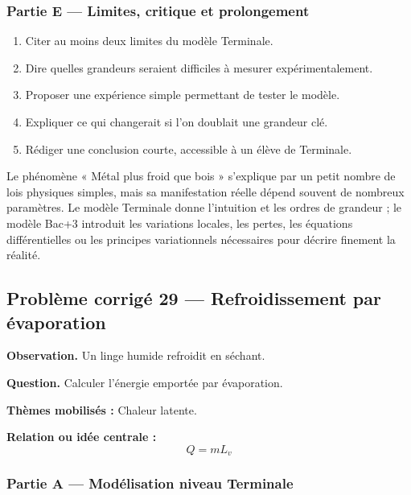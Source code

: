 \documentclass[11pt,a4paper]{article}
\begin{document}
\subsubsection*{Partie E — Limites, critique et prolongement}

\begin{enumerate}
  \item Citer au moins deux limites du modèle Terminale.
  \item Dire quelles grandeurs seraient difficiles à mesurer expérimentalement.
  \item Proposer une expérience simple permettant de tester le modèle.
  \item Expliquer ce qui changerait si l'on doublait une grandeur clé.
  \item Rédiger une conclusion courte, accessible à un élève de Terminale.
\end{enumerate}

\begin{corrigebox}
Le phénomène « Métal plus froid que bois » s'explique par un petit nombre de lois physiques simples, mais sa manifestation réelle dépend souvent de nombreux paramètres. Le modèle Terminale donne l'intuition et les ordres de grandeur ; le modèle Bac+3 introduit les variations locales, les pertes, les équations différentielles ou les principes variationnels nécessaires pour décrire finement la réalité.
\end{corrigebox}

\subsection{Problème corrigé 29 — Refroidissement par évaporation}

\begin{exercicebox}
\textbf{Observation.} Un linge humide refroidit en séchant.

\medskip
\textbf{Question.} Calculer l'énergie emportée par évaporation.

\medskip
\textbf{Thèmes mobilisés :} Chaleur latente.

\medskip
\textbf{Relation ou idée centrale :}
\[
Q=mL_v
\]
\end{exercicebox}

\subsubsection*{Partie A — Modélisation niveau Terminale}
\end{document}
